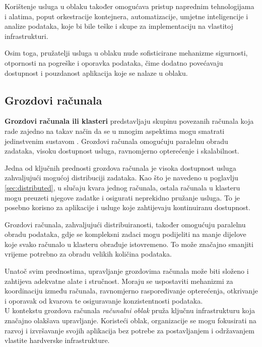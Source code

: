 \documentclass[times, utf8, diplomski]{fer}
\begin{document}
Korištenje usluga u oblaku također omogućava pristup naprednim tehnologijama i alatima, poput orkestracije kontejnera, automatizacije, umjetne inteligencije i analize podataka, koje bi bile teške i skupe za implementaciju na vlastitoj infrastrukturi.

Osim toga, pružatelji usluga u oblaku nude sofisticirane mehanizme sigurnosti, otpornosti na pogreške i oporavka podataka, čime dodatno povećavaju dostupnost i pouzdanost aplikacija koje se nalaze u oblaku.

\subsection{Grozdovi računala}

\textbf{Grozdovi računala ili klasteri}  predstavljaju skupinu povezanih računala koja rade zajedno na takav način da se u mnogim aspektima mogu smatrati jedinstvenim sustavom \citep{zarko_raspodijeljeni_2013}. Grozdovi računala omogućuju paralelnu obradu zadataka, visoku dostupnost usluga, ravnomjerno opterećenje i skalabilnost.

Jedna od ključnih prednosti grozdova računala je visoka dostupnost usluga zahvaljujući mogućoj distribuciji zadataka. Kao što je navedeno u poglavlju \ref{sec:distributed}, u slučaju kvara jednog računala, ostala računala u klasteru mogu preuzeti njegove zadatke i osigurati neprekidno pružanje usluga. To je posebno korisno za aplikacije i usluge koje zahtijevaju kontinuiranu dostupnost.

Grozdovi računala, zahvaljujući distribuiranosti, također omogućuju paralelnu obradu podataka, gdje se kompleksni zadaci mogu podijeliti na manje dijelove koje svako računalo u klasteru obrađuje istovremeno. To može značajno smanjiti vrijeme potrebno za obradu velikih količina podataka.

Unatoč svim prednostima, upravljanje grozdovima računala može biti složeno i zahtijeva adekvatne alate i stručnost. Moraju se uspostaviti mehanizmi za koordinaciju između računala, ravnomjerno raspoređivanje opterećenja, otkrivanje i oporavak od kvarova te osiguravanje konzistentnosti podataka. \\

U kontekstu grozdova računala \emph{računalni oblak}  pruža ključnu infrastrukturu koja značajno olakšava upravljanje. Koristeći oblak, organizacije se mogu fokusirati na razvoj i izvršavanje svojih aplikacija bez potrebe za postavljanjem i održavanjem vlastite hardverske infrastrukture.
\end{document}
